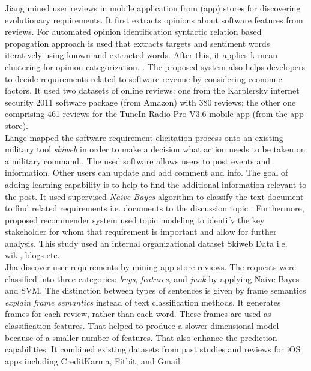 Jiang \etal \cite{Jiang:2014} mined user reviews in mobile application from 
(app) stores for discovering evolutionary requirements. It first extracts opinions about software features from reviews. For automated opinion identification syntactic
relation based propagation approach is used that extracts targets and sentiment words
iteratively using known and extracted words. After this, it applies k-mean clustering for opinion categorization.
. The proposed system also helps developers to decide requirements related to software revenue by considering economic factors.  It used two datasets of online reviews: one from the
Karplersky internet security 2011 software package (from Amazon) with 380
reviews; the other one  comprising 461 reviews for the  TuneIn Radio Pro V3.6
mobile app (from the app store).\\

Lange \etal\cite{Douglas:S2008} mapped the software requirement elicitation
process onto an existing military tool \emph{skiweb} in order to make a decision what action needs to be taken on a military command.. The used software allows users to post events and information. Other users can update and add comment and info. The goal of adding learning capability is to help to find the additional information relevant to the post.  It used supervised
\emph{Naive Bayes} algorithm to classify the text document to find related
requirements i.e. documents to the discussion topic . Furthermore, proposed recommender
system used topic modeling to identify the key
stakeholder for whom that requirement is important and allow for further
analysis. This study used an internal organizational
dataset Skiweb Data i.e. wiki, blogs etc.\\

Jha \etal \cite{Jha:2017} discover user requirements by mining app store reviews. The requests were classified into three categories:
\emph{bugs}, \emph{features}, and \emph{junk} by applying Naive Bayes and SVM. The distinction between types of sentences is given by frame semantics \emph{explain frame semantics} instead of text classification methods. It generates frames for each review, rather than each word. These frames are used as classification features. That helped to
produce a slower dimensional model because of a smaller number of
features. That also enhance the prediction capabilities. It combined existing
datasets from past studies and reviews for iOS apps including CreditKarma,
Fitbit, and Gmail.

